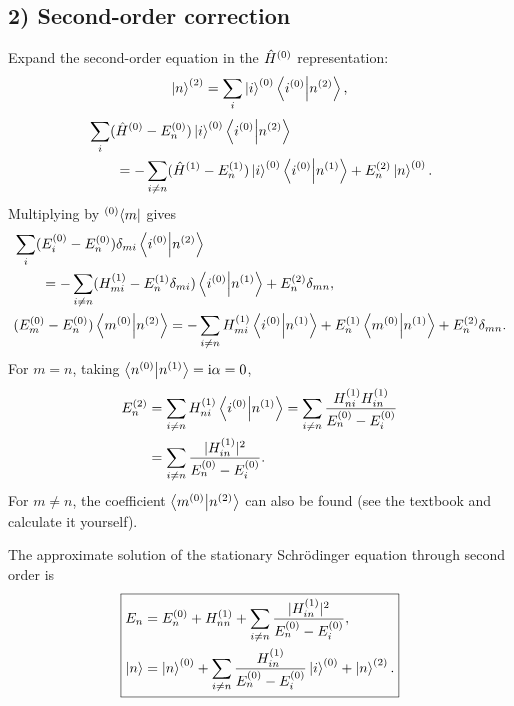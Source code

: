 \subsection*{2) Second-order correction}
Expand the second-order equation in the $\hat{H}^{(0)}$ representation:
\begin{equation}
 \left|n\right\rangle^{(2)}=\sum_i\left|i\right\rangle^{(0)}\left\langle i^{(0)}\middle|n^{(2)}\right\rangle,
\end{equation}
\begin{equation}\begin{aligned}
 &\sum_i(\hat{H}^{(0)}-E_n^{(0)})\left|i\right\rangle^{(0)}
 \left\langle i^{(0)}\middle|n^{(2)}\right\rangle\\
 &\qquad=-\sum_{i\ne n}(\hat{H}^{(1)}-E_n^{(1)})\left|i\right\rangle^{(0)}
 \left\langle i^{(0)}\middle|n^{(1)}\right\rangle+E_n^{(2)}\left|n\right\rangle^{(0)}.
\end{aligned}\end{equation}
Multiplying by ${}^{(0)}\!\left\langle m\right|$ gives
\begin{equation}\begin{aligned}
 &\sum_i(E_i^{(0)}-E_n^{(0)})\delta_{mi}
 \left\langle i^{(0)}\middle|n^{(2)}\right\rangle\\
 &\qquad=-\sum_{i\ne n}(H_{mi}^{(1)}-E_n^{(1)}\delta_{mi})
 \left\langle i^{(0)}\middle|n^{(1)}\right\rangle+E_n^{(2)}\delta_{mn},\\
 &(E_m^{(0)}-E_n^{(0)})\left\langle m^{(0)}\middle|n^{(2)}\right\rangle
 =-\sum_{i\ne n}H_{mi}^{(1)}\left\langle i^{(0)}\middle|n^{(1)}\right\rangle
 +E_n^{(1)}\left\langle m^{(0)}\middle|n^{(1)}\right\rangle+E_n^{(2)}\delta_{mn}.
\end{aligned}\end{equation}
For $m=n$, taking $\left\langle n^{(0)}\middle|n^{(1)}\right\rangle=\mathrm{i}\alpha=0$,
\begin{equation}\begin{aligned}
 E_n^{(2)}
 &=\sum_{i\ne n}H_{ni}^{(1)}\left\langle i^{(0)}\middle|n^{(1)}\right\rangle
 =\sum_{i\ne n}\frac{H_{ni}^{(1)}H_{in}^{(1)}}{E_n^{(0)}-E_i^{(0)}}\\
 &=\sum_{i\ne n}\frac{|H_{in}^{(1)}|^2}{E_n^{(0)}-E_i^{(0)}}.
\end{aligned}\end{equation}
For $m\ne n$, the coefficient $\left\langle m^{(0)}\middle|n^{(2)}\right\rangle$ can also be found (see the textbook and calculate it yourself).

The approximate solution of the stationary Schr\"odinger equation through second order is
\begin{equation}
 \boxed{\begin{aligned}
 E_n&=E_n^{(0)}+H_{nn}^{(1)}
 +\sum_{i\ne n}\frac{|H_{in}^{(1)}|^2}{E_n^{(0)}-E_i^{(0)}},\\
 \left|n\right\rangle&=\left|n\right\rangle^{(0)}
 +\sum_{i\ne n}\frac{H_{in}^{(1)}}{E_n^{(0)}-E_i^{(0)}}\left|i\right\rangle^{(0)}
 +\left|n\right\rangle^{(2)}.
 \end{aligned}}
\end{equation}
